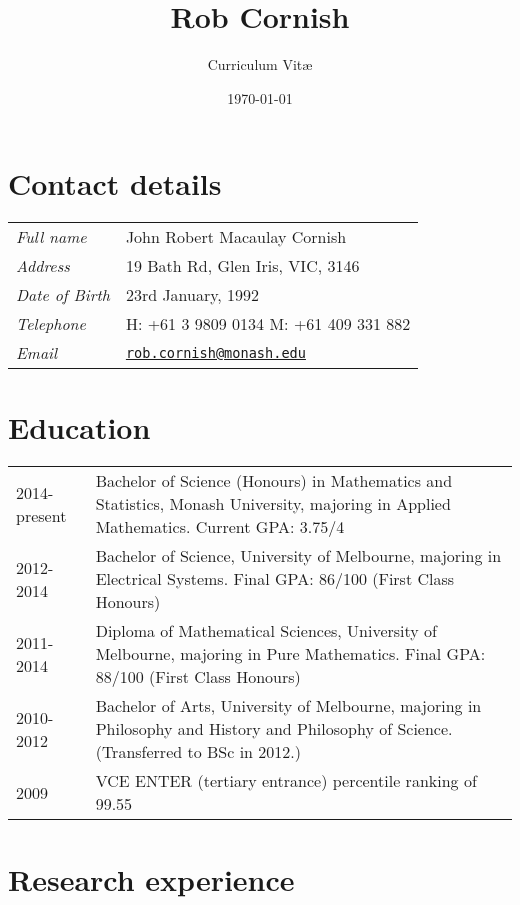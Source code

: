 \documentclass[12pt,a4paper]{article}
\title{\bfseries \huge Rob Cornish}
\author{Curriculum Vit\ae}
\date{\today}
\newcommand{\mailto}[1]{\href{mailto:#1}{\texttt{#1}}}
\newenvironment{llist}
	{\renewcommand{\arraystretch}{1.5}\begin{longtable}{p{3.5cm} p{12cm}}}
	{\end{longtable}}
\begin{document}
\maketitle

\thispagestyle{empty}

\section*{Contact details}
\begin{llist}
	\textit{Full name} & John Robert Macaulay Cornish \\
	\textit{Address} & 19 Bath Rd, Glen Iris, VIC, 3146 \\
	\textit{Date of Birth} & 23rd January, 1992 \\
	\textit{Telephone} & H: +61 3 9809 0134 \newline M: +61 409 331 882 \\
	\textit{Email} & \mailto{rob.cornish@monash.edu}
\end{llist}

\section*{Education}

\begin{llist}
  2014-present & Bachelor of Science (Honours) in Mathematics and Statistics, Monash University,
  majoring in Applied Mathematics. Current GPA: 3.75/4 \\ 
  2012-2014 & Bachelor of Science, University of Melbourne, majoring in
  Electrical Systems. Final GPA: 86/100 (First Class Honours) \\
  2011-2014 & Diploma of Mathematical Sciences, University of Melbourne,
  majoring in Pure Mathematics. Final GPA: 88/100 (First Class Honours) \\
  2010-2012 & Bachelor of Arts, University of Melbourne, majoring in Philosophy
  and History and Philosophy of Science. (Transferred to BSc in 2012.) \\
	2009 & VCE ENTER (tertiary entrance) percentile ranking of 99.55
\end{llist}

\section*{Research experience}
\end{document}
